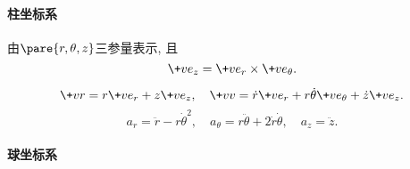 \documentclass{ctexart}
\begin{document}

\paragraph{柱坐标系} %
\label{par:柱坐标系}

由$\pare{r,\theta,z}$三参量表示, 且
\[ \+ve_z = \+ve_r \times \+ve_\theta. \]
\begin{finale}
    \begin{theorem}
        \[ \+vr = r\+ve_r + z\+ve_z,\quad \+vv = \dot{r}\+ve_r + r\dot{\theta}\+ve_\theta + \dot{z}\+ve_z. \]
        \[ a_r = \ddot{r} - r\dot{\theta}^2,\quad a_\theta = r\ddot{\theta} + 2\dot{r}\dot{\theta},\quad a_z = \ddot{z}. \]
    \end{theorem}
\end{finale}


\paragraph{球坐标系} %
\label{par:球坐标系}
\end{document}
